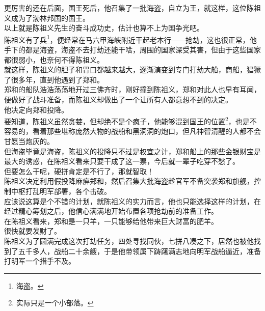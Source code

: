 \begin{multicols}{\theparacolNo}
更厉害的还在后面，国王死后，他召集了一批海盗，自立为王，就这样，这位陈祖义成为了渤林邦国的国王。\\

以上就是陈祖义先生的奋斗成功史，估计也算不上为国争光吧。\\

陈祖义有了兵\footnote{海盗。}，便经常在马六甲海峡附近干起老本行——抢劫，这也很正常，他手下的都是海盗，海盗不去打劫还能干啥，周围的国家深受其害，但由于这些国家都很弱小，也奈何不得陈祖义。\\

就这样，陈祖义的胆子和胃口都越来越大，逐渐演变到专门打劫大船，商船，猖獗了很多年，直到他遇到了郑和。\\

郑和的船队浩浩荡荡地开过三佛齐时，刚好撞到陈祖义，郑和对此人也早有耳闻，便做好了战斗准备，而陈祖义却做出了一个让所有人都意想不到的决定。\\

他决定向郑和投降。\\

要知道，陈祖义虽然贪婪，但却绝不是个疯子，他能够混到国王的位置\footnote{实际只是一个小部落。}，也是不容易的，看着那些堪称庞然大物的战船和黑洞洞的炮口，但凡神智清醒的人都不会甘愿当炮灰的。\\

但海盗毕竟是海盗，陈祖义的投降只不过是权宜之计，郑和船上的那些金银财宝是最大的诱惑，在陈祖义看来只要干成了这一票，今后就一辈子吃穿不愁了。\\

但要怎么干呢，硬拼肯定是不行了，那就智取！\\

陈祖义决定利用假投降麻痹郑和，然后召集大批海盗趁官军不备突袭郑和旗舰，控制中枢打乱明军部署，各个击破。\\

应该说这算是个不错的计划，就陈祖义的实力而言，他也只能选择这样的计划，在经过精心筹划之后，他信心满满地开始布置各项抢劫前的准备工作。\\

在陈祖义看来，郑和是一只羊，一只能够给他带来巨大财富的肥羊。\\

很快就要发财了。\\

陈祖义为了圆满完成这次打劫任务，四处寻找同伙，七拼八凑之下，居然也被他找到了五千多人，战船二十余艘，于是他带领属下踌躇满志地向明军战船逼近，准备打明军一个措手不及。\\


\end{multicols}
